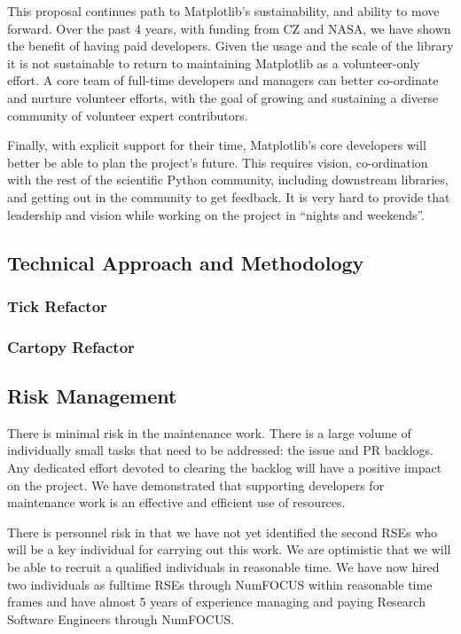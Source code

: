 \documentclass[12pt]{article}
\numberwithin{page}{section}
\begin{document}
This proposal continues path to Matplotlib's sustainability, and ability to
move forward.  Over the past 4 years, with funding from CZ and NASA, we have
shown the benefit of having paid developers.  Given the usage and the scale of
the library it is not sustainable to return to maintaining Matplotlib as a
volunteer-only effort.  A core team of full-time developers and managers can
better co-ordinate and nurture volunteer efforts, with the goal of growing and
sustaining a diverse community of volunteer expert contributors.

Finally, with explicit support for their time, Matplotlib's core developers
will better be able to plan the project's future.  This requires vision,
co-ordination with the rest of the scientific Python community, including
downstream libraries, and getting out in the community to get feedback.  It is
very hard to provide that leadership and vision while working on the project in
``nights and weekends''.

\subsection{Technical Approach and Methodology}
\subsubsection{Tick Refactor}
\subsubsection{Cartopy Refactor}


\subsection{Risk Management}

There is minimal risk in the maintenance work.  There is a large volume
of individually small tasks that need to be addressed: the issue and
PR backlogs.  Any dedicated effort devoted to clearing the backlog
will have a positive impact on the project.  We have demonstrated that
supporting developers for maintenance work is an effective and
efficient use of resources.


There is personnel risk in that we have not yet identified the second RSEs who
will be a key individual for carrying out this work.  We are optimistic that we
will be able to recruit a qualified individuals in reasonable time.  We have
now hired two individuals as fulltime RSEs through NumFOCUS within reasonable
time frames and have almost 5 years of experience managing and paying
Research Software Engineers through NumFOCUS.
\end{document}

